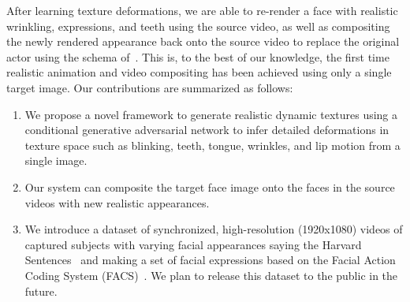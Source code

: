 After learning texture deformations, we are able to re-render a face with realistic wrinkling, expressions, and teeth using the source video, 
as well as compositing the newly rendered appearance back onto the source video to replace the original actor using the schema of~\cite{replace}.  This is, to the best of our knowledge, the first time realistic animation and video compositing has been achieved using only a single target image. 
Our contributions are summarized as follows:


\begin{enumerate}
\item We propose a novel framework to generate realistic dynamic textures using a conditional generative adversarial network to infer detailed deformations in texture space such as blinking, teeth, tongue, wrinkles, and lip motion from a single image.
\item Our system can composite the target face image onto the faces in the source videos with new realistic appearances.
\item We introduce a dataset of synchronized, high-resolution (1920x1080) videos of captured subjects with varying facial appearances saying the Harvard Sentences~\cite{HarvardSent:1969} and making a set of facial expressions based on the Facial Action Coding System (FACS)~\cite{Ekman:1978}. We plan to release this dataset to the public in the future.
\end{enumerate}
